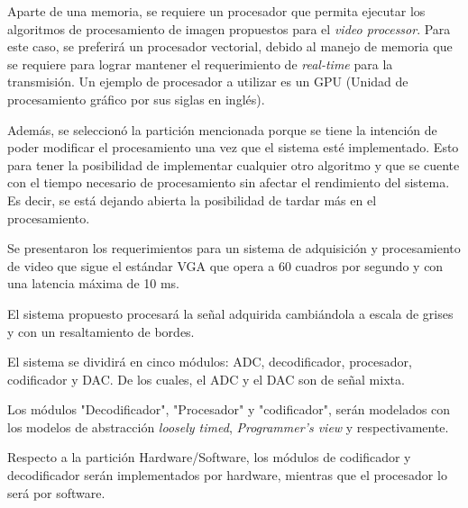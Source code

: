 \documentclass[10pt, letterpaper, conference]{IEEEtran}
\begin{document}
Aparte de una memoria, se requiere un procesador que permita ejecutar los
algoritmos de procesamiento de imagen propuestos para el 
\emph{video processor}. Para este caso, se preferir\'a un procesador 
vectorial, debido al manejo de memoria que se requiere para lograr mantener
el requerimiento de \emph{real-time} para la transmisi\'on. Un ejemplo de 
procesador a utilizar es un GPU (Unidad de procesamiento gr\'afico por sus
siglas en ingl\'es).

Adem\'as, se seleccion\'o la partici\'on mencionada porque se tiene la intenci\'on
de poder modificar el procesamiento una vez que el sistema est\'e implementado. 
Esto para tener la posibilidad de implementar cualquier otro algoritmo y que se 
cuente con el tiempo necesario de procesamiento sin afectar el rendimiento 
del sistema. Es decir, se est\'a dejando abierta la posibilidad de tardar 
m\'as en el procesamiento.


Se presentaron los requerimientos para un sistema de adquisici\'on y procesamiento
de video que sigue el est\'andar VGA que opera a 60 cuadros por segundo y con una
latencia m\'axima de 10 ms.

El sistema propuesto procesar\'a la se\~nal adquirida cambi\'andola a escala de
grises y con un resaltamiento de bordes.

El sistema se dividir\'a en cinco m\'odulos: ADC, decodificador, procesador, 
codificador y DAC. De los cuales, el ADC y el DAC son de se\~nal mixta.

Los m\'odulos "Decodificador", "Procesador" y "codificador", ser\'an modelados con los 
modelos de abstracci\'on \textit{loosely timed}, \textit{Programmer's view} y 
 respectivamente.

Respecto a la partici\'on Hardware/Software, los m\'odulos de codificador y 
decodificador ser\'an implementados por hardware, mientras que el procesador lo 
ser\'a por software.


 

\end{document}
